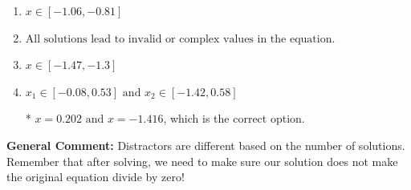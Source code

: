 \documentclass{extbook}[14pt]
\begin{document}
\begin{enumerate}
{\begin{enumerate}[label=\Alph*.]
\item \( x \in [-1.06,-0.81] \)


\item \( \text{All solutions lead to invalid or complex values in the equation.} \)


\item \( x \in [-1.47,-1.3] \)


\item \( x_1 \in [-0.08, 0.53] \text{ and } x_2 \in [-1.42,0.58] \)

* $x = 0.202 \text{ and } x = -1.416$, which is the correct option.
\end{enumerate}

\textbf{General Comment:} Distractors are different based on the number of solutions. Remember that after solving, we need to make sure our solution does not make the original equation divide by zero!
}
\end{enumerate}
\end{document}

